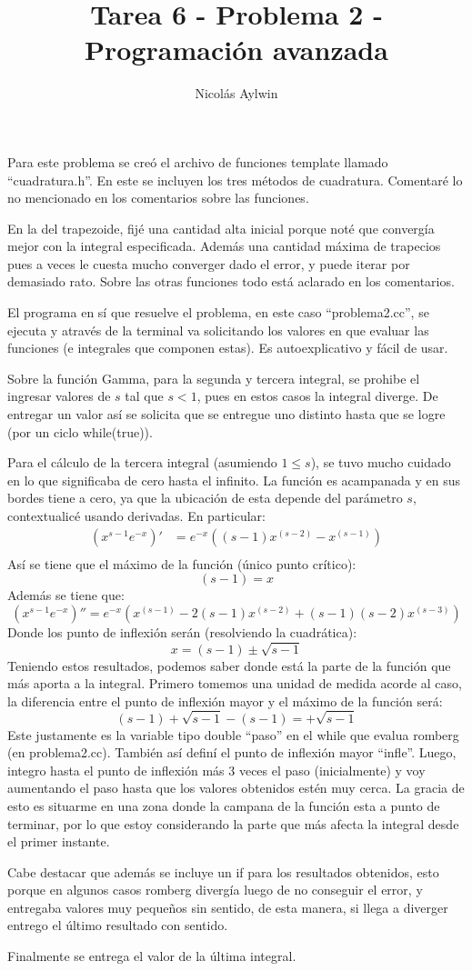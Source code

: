 \documentclass[12pt]{article}
\title{Tarea 6 - Problema 2 - Programación avanzada}
\author{Nicolás Aylwin}
\date{}
\begin{document}
\maketitle
Para este problema se creó el archivo de funciones template llamado ``cuadratura.h''. En este se incluyen los tres métodos de cuadratura. Comentaré lo no mencionado en los comentarios sobre las funciones.

En la del trapezoide, fijé una cantidad alta inicial porque noté que convergía mejor con la integral especificada. Además una cantidad máxima de trapecios pues a veces le cuesta mucho converger dado el error, y puede iterar por demasiado rato. Sobre las otras funciones todo está aclarado en los comentarios.

El programa en sí que resuelve el problema, en este caso ``problema2.cc'', se ejecuta y através de la terminal va solicitando los valores en que evaluar las funciones (e integrales que componen estas). Es autoexplicativo y fácil de usar.

Sobre la función Gamma, para la segunda y tercera integral, se prohibe el ingresar valores de $s$ tal que $s<1$, pues en estos casos la integral diverge. De entregar un valor así se solicita que se entregue uno distinto hasta que se logre (por un ciclo while(true)). 

Para el cálculo de la tercera integral (asumiendo $1 \leq s$), se tuvo mucho cuidado en lo que significaba de cero hasta el infinito. La función es acampanada y en sus bordes tiene a cero, ya que la ubicación de esta depende del parámetro $s$, contextualicé usando derivadas. En particular:
\begin{align*}
(x^{s-1}e^{-x})'&=e^{-x}((s-1)x^{(s-2)}-x^{(s-1)})\\
\end{align*}
Así se tiene que el máximo de la función (único punto crítico):
$$(s-1)=x$$
Además se tiene que:
$$(x^{s-1}e^{-x})''=e^{-x}(x^{(s-1)}-2(s-1)x^{(s-2)}+(s-1)(s-2)x^{(s-3)})$$
Donde los punto de inflexión serán (resolviendo la cuadrática):
$$x=(s-1)\pm \sqrt{s-1}$$
Teniendo estos resultados, podemos saber donde está la parte de la función que más aporta a la integral. Primero tomemos una unidad de medida acorde al caso, la diferencia entre el punto de inflexión mayor y el máximo de la función será:
$$(s-1)+ \sqrt{s-1}-(s-1)=+\sqrt{s-1}$$
Este justamente es la variable tipo double ``paso'' en el while que evalua romberg (en problema2.cc). También así definí el punto de inflexión mayor ``infle''. Luego, integro hasta el punto de inflexión más 3 veces el paso (inicialmente) y voy aumentando el paso hasta que los valores obtenidos estén muy cerca. La gracia de esto es situarme en una zona donde la campana de la función esta a punto de terminar, por lo que estoy considerando la parte que más afecta la integral desde el primer instante.

Cabe destacar que además se incluye un if para los resultados obtenidos, esto porque en algunos casos romberg divergía luego de no conseguir el error, y entregaba valores muy pequeños sin sentido, de esta manera, si llega a diverger entrego el último resultado con sentido.

Finalmente se entrega el valor de la última integral. 
\end{document}
